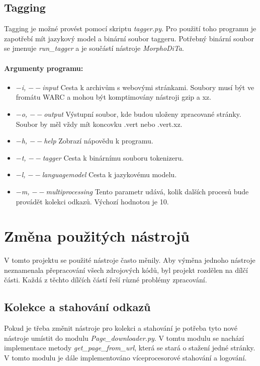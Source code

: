 \subsection{Tagging}
Tagging je možné provést pomocí skriptu \textit{tagger.py}. Pro použití toho programu je zapotřebí
mít jazykový model a binární soubor taggeru. Potřebný binární soubor se jmenuje \textit{run\_tagger}
a je součástí nástroje \textit{MorphoDiTa}.

\paragraph{Argumenty programu: }
\begin{itemize}
    \item \textit{$-$i, $--$input} Cesta k archivům s webovými stránkami. Soubory musí být ve fromátu WARC a mohou být komptimovány nástroji gzip a xz.
    \item \textit{$-$o, $--$output} Výstupní soubor, kde budou uloženy zpracované stránky. Soubor by měl vždy mít koncovku .vert nebo .vert.xz.
    \item \textit{$-$h, $--$help} Zobrazí nápovědu k programu.
    \item \textit{$-$t, $--$tagger} Cesta k binárnímu souboru tokenizeru.
    \item \textit{$-$l, $--$languagemodel} Cesta k jazykovému modelu.
    \item \textit{$-$m, $--$multiprocessing} Tento parametr udává, kolik dalších procesů bude provádět kolekci odkazů. Výchozí hodnotou je 10.
\end{itemize}

\section{Změna použitých nástrojů}
V tomto projektu se použité nástroje často měnily. Aby výměna jednoho nástroje neznamenala
přepracování všech zdrojových kódů, byl projekt rozdělen na dílčí části. Každá z těchto
dílčích částí řeší různé problémy zpracování.

\subsection{Kolekce a stahování odkazů}
Pokud je třeba změnit nástroje pro kolekci a stahování je potřeba tyto nové nástroje
umístit do modulu \textit{Page\_downloader.py}. V tomtu modulu se nachází implementace
metody \textit{get\_page\_from\_url}, která se stará o stažení jedné stránky. V tomto
modulu je dále implementováno víceprocesorové stahování a logování.


